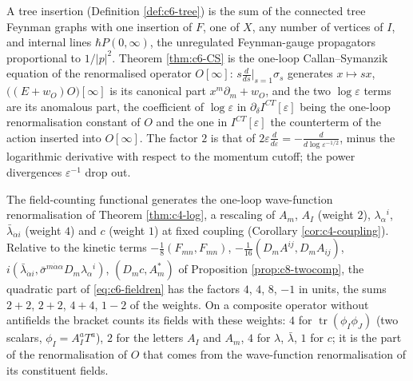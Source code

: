 \begin{remark}
A tree insertion (Definition \ref{def:c6-tree}) is the sum of the connected tree Feynman graphs with one insertion of $F$, one of $X$, any number of vertices of $I$, and internal lines $\hbar P(0,\infty)$, the unregulated Feynman-gauge propagators proportional to $1/|p|^2$. Theorem \ref{thm:c6-CS} is the one-loop Callan--Symanzik equation of the renormalised operator $O[\infty]$: $s\frac{d}{ds}\big|_{s=1}\sigma_s$ generates $x\mapsto sx$, $\big((E+w_O)O\big)[\infty]$ is its canonical part $x^m\partial_m+w_O$, and the two $\log\varepsilon$ terms are its anomalous part, the coefficient of $\log\varepsilon$ in $\partial_\delta I^{CT}[\varepsilon]$ being the one-loop renormalisation constant of $O$ and the one in $I^{CT}[\varepsilon]$ the counterterm of the action inserted into $O[\infty]$. The factor $2$ is that of $2\varepsilon\frac{d}{d\varepsilon}=-\frac{d}{d\log\varepsilon^{-1/2}}$, minus the logarithmic derivative with respect to the momentum cutoff; the power divergences $\varepsilon^{-1}$ drop out.
\end{remark}

\begin{remark}
The field-counting functional generates the one-loop wave-function renormalisation of Theorem \ref{thm:c4-log}, a rescaling of $A_m$, $A_I$ (weight $2$), $\lambda_\alpha{}^i$, $\bar\lambda_{\dot\alpha i}$ (weight $4$) and $c$ (weight $1$) at fixed coupling (Corollary \ref{cor:c4-coupling}). Relative to the kinetic terms $-\tfrac18(F_{mn},F_{mn})$, $-\tfrac1{16}(D_mA^{ij},D_mA_{ij})$, $i(\bar\lambda_{\dot\alpha i},\bar\sigma^{m\dot\alpha\alpha}D_m\lambda_\alpha{}^i)$, $(D_mc,A^*_m)$ of Proposition \ref{prop:c8-twocomp}, the quadratic part of \eqref{eq:c6-fieldren} has the factors $4$, $4$, $8$, $-1$ in units, the sums $2+2$, $2+2$, $4+4$, $1-2$ of the weights. On a composite operator without antifields the bracket counts its fields with these weights: $4$ for $\operatorname{tr}(\phi_I\phi_J)$ (two scalars, $\phi_I=A^a_IT^a$), $2$ for the letters $A_I$ and $A_m$, $4$ for $\lambda$, $\bar\lambda$, $1$ for $c$; it is the part of the renormalisation of $O$ that comes from the wave-function renormalisation of its constituent fields.
\end{remark}

